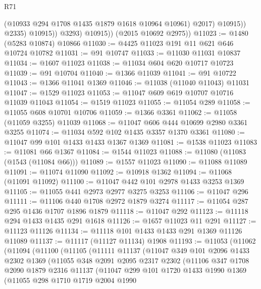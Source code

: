 \begin{lexlean}{R71}
\begin{coremodule}
                        (@10933 @294 @1708 @1435 @1879 @1618 @10964 @10961)
                        @2017)
                      @10915))
                  @2335)
                @10915))
            @3293)
          @10915))
      (@2015 @10692 @2975))
@11023 := @1480 (@5283 @10874) @10866
@11030 := @4425 @11023 @191 @11 @621 @646 @10724 @10782
@11031 := @91 @10747
@11033 := @11030 @11031 @10837
@11034 := @1607 @11023
@11038 := @11034 @604 @620 @10717 @10723
@11039 := @91 @10704
@11040 := @1366 @11039
@11041 := @91 @10722
@11043 := @1366 @11041 @1369
@11046 := @11038 (@11040 @11043) @11031
@11047 := @1529 @11023
@11053 := @11047 @609 @619 @10707 @10716 @11039 @11043
@11054 := @1519 @11023
@11055 := @11054 @289
@11058 := @11055 @608 @10701 @10706
@11059 := @1366 @3361
@11062 := @11058 (@11059 @3255) @11039
@11068 := @11047 @606 @444 @10699 @2980 @3361 @3255
@11074 := @11034 @592 @102 @1435 @3357 @1370 @3361
@11080 := @11047 @99 @101 @1433 @1433 @1367 @1369
@11081 := @1538 @11023
@11083 := @11081 @66 @1367
@11084 := @1544 @11023
@11088 := @11080 (@11083 (@1543 (@11084 @66)))
@11089 := @1557 @11023
@11090 := @11088 @11089
@11091 := @11074 @11090
@11092 := @10918 @1362
@11094 := @11068 (@11091 @11092)
@11100 := @11047 @442 @101 @2978 @1433 @3253 @1369
@11105 := @11055 @441 @2973 @2977 @3275 @3253
@11106 := @11047 @296
@11111 := @11106 @440 @1708 @2972 @1879 @3274
@11117 := @11054 @287 @295 @1436 @1707 @1896 @1879
@11118 := @11047 @292
@11123 := @11118 @294 @1433 @1435 @291 @1618
@11126 := @1657 @11023 @11 @291
@11127 := @11123 @11126
@11134 := @11118 @101 @1433 @1433 @291 @1369 @11126 @11089
@11137 := @11117 (@11127 @11134) @1908
@11193 := @11053
    (@11062
      (@11094
        (@11100
          (@11105
            (@11111
              @11137
              (@11047
                @349
                @101
                @2096
                @1433
                @2302
                @1369
                (@11055
                  @348
                  @2091
                  @2095
                  @2317
                  @2302
                  (@11106
                    @347
                    @1708
                    @2090
                    @1879
                    @2316
                    @11137
                    (@11047
                      @299
                      @101
                      @1720
                      @1433
                      @1990
                      @1369
                      (@11055
                        @298
                        @1710
                        @1719
                        @2004
                        @1990

\end{coremodule}
\end{lexlean}
